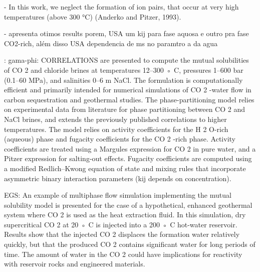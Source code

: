 - In this work, we neglect the formation of ion
pairs, that occur at very high temperatures (above 300 °C) (Anderko
and Pitzer, 1993).

- apresenta otimos results porem, USA um kij para fase aquosa e outro pra fase CO2-rich, além disso USA dependencia de ms no paramtro a da agua



\cite{Spycher2010}: gama-phi: CORRELATIONS are presented to compute the mutual solubilities of CO 2 and chloride brines at temperatures 12–300 ◦ C, pressures 1–600 bar (0.1–60 MPa), and salinities 0–6 m NaCl. The formulation is computationally efficient and primarily intended for numerical simulations of CO 2 -water flow in carbon sequestration and geothermal studies. The phase-partitioning model relies on experimental data from literature for phase partitioning between CO 2 and NaCl brines, and extends the previously published correlations to higher temperatures. The model relies on activity coefficients for the H 2 O-rich (aqueous) phase and fugacity coefficients for the CO 2 -rich phase. Activity coefficients are treated using a Margules expression for CO 2 in pure water, and a Pitzer expression for salting-out effects. Fugacity coefficients are computed using a modified Redlich–Kwong equation of state and mixing rules that incorporate asymmetric binary interaction parameters (kij depends on concentration).

EGS: An example of multiphase flow simulation implementing the mutual solubility model is presented for the case of a hypothetical, enhanced geothermal system where CO 2 is used as the heat extraction fluid. In this simulation, dry supercritical CO 2 at 20 ◦ C is injected into a 200 ◦ C hot-water reservoir. Results show that the injected CO 2 displaces the formation water relatively quickly, but that the produced CO 2 contains significant water for long periods of time. The amount of water in the CO 2 could have implications for reactivity with reservoir rocks and engineered materials.

